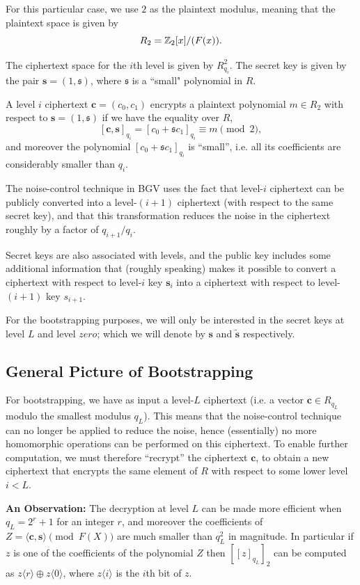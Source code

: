 \documentclass[12pt]{article}
\theoremstyle{plain}
\theoremstyle{definition}
\theoremstyle{remark}
\begin{document}
For this particular case, we use $2$ as the plaintext modulus, meaning that the plaintext space is given by 
$$R_2 = \mathbb{Z}_2[x]/(F(x)).$$

The ciphertext space for the $i$th level is given by $R_{q_i}^2$. The secret key is given by the pair $\mathbf{s} = (1, \mathfrak{s})$, where $\mathfrak{s}$ is a ``small" polynomial in $R$. 

A level $i$ ciphertext $\mathbf{c} = (c_0, c_1)$ encrypts a plaintext polynomial $m \in R_2$ with respect to $\mathbf{s} = (1, \mathfrak{s})$ if we have the equality over $R$, 
$$[\mathbf{c}, \mathbf{s}]_{q_i} = [c_0 + \mathfrak{s}c_1]_{q_i} \equiv m \pmod{2},$$
and moreover the polynomial $[c_0 + \mathfrak{s}c_1]_{q_i}$ is ``small”, i.e. all its coefficients are considerably smaller than $q_i$.

The noise-control technique in BGV uses the fact that level-$i$ ciphertext can be publicly converted into a level-$(i + 1)$ ciphertext (with respect to the same secret key), and that this transformation reduces the noise in the ciphertext roughly by a factor of $q_{i+1}/q_i$.

Secret keys are also associated with levels, and the public key includes some additional information that (roughly speaking) makes it possible to convert a ciphertext with respect to level-$i$ key $\mathbf{s}_i$ into a ciphertext with respect to level-$(i + 1)$ key $s_{i+1}$.

For the bootstrapping purposes, we will only be interested in the secret keys at level $L$ and level $zero$;
which we will denote by $\mathbf{s}$ and $\tilde{\mathbf{s}}$ respectively.

\subsection{General Picture of Bootstrapping}
For bootstrapping, we have as input a level-$L$ ciphertext (i.e. a vector $\mathbf{c} \in R_{q_L}$ modulo the smallest modulus $q_L$). This means that the noise-control technique can no longer be applied to reduce the noise, hence (essentially) no more homomorphic operations can be performed on this ciphertext. To enable further computation, we must therefore ``recrypt” the ciphertext $\mathbf{c}$, to obtain a new ciphertext that encrypts the same element of $R$ with respect to some lower level $i <L$.

{\bf An Observation:} The decryption at level $L$ can be made more efficient when
$q_L = 2^r+1$ for an integer $r$, and moreover
the coefficients of $Z = \langle \mathbf{c}, \mathbf{s}\rangle \pmod{F(X)}$ are much smaller than $q_L^2$ in magnitude.
In particular if $z$ is one of the coefficients of the polynomial $Z$ then $[[z]_{q_L}]_2$ can be
computed as $z\langle r \rangle\oplus z\langle 0 \rangle$, where $z\langle i\rangle$ is the $i$th bit of $z$.
\end{document}
